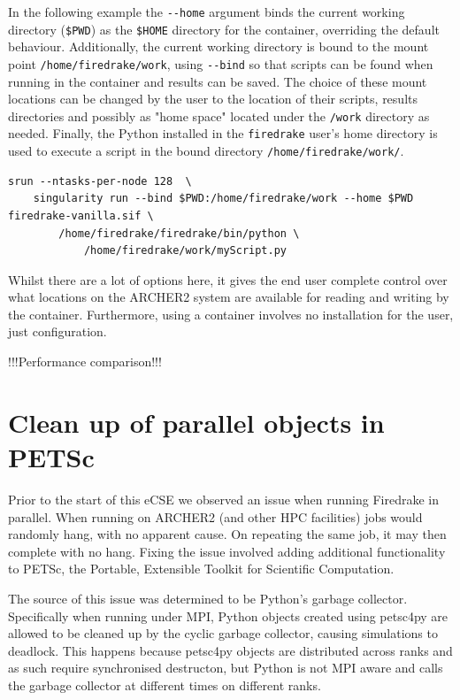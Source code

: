 \documentclass[a4paper,11pt]{article}
\begin{document}
In the following example the \verb`--home` argument binds the current working directory (\verb`$PWD`) as the \verb`$HOME` directory for the container, overriding the default behaviour.
Additionally, the current working directory is bound to the mount point \verb`/home/firedrake/work`, using \verb`--bind` so that scripts can be found when running in the container and results can be saved.
The choice of these mount locations can be changed by the user to the location of their scripts, results directories and possibly as "home space" located under the \verb`/work` directory as needed.
Finally, the Python installed in the \verb`firedrake` user's home directory is used to execute a script in the bound directory \verb`/home/firedrake/work/`.

\begin{lstlisting}
srun --ntasks-per-node 128  \
    singularity run --bind $PWD:/home/firedrake/work --home $PWD firedrake-vanilla.sif \
        /home/firedrake/firedrake/bin/python \
            /home/firedrake/work/myScript.py
\end{lstlisting}
Whilst there are a lot of options here, it gives the end user complete control over what locations on the ARCHER2 system are available for reading and writing by the container.
Furthermore, using a container involves no installation for the user, just configuration.

!!!Performance comparison!!!


\section{Clean up of parallel objects in PETSc}
\label{sec:other}
Prior to the start of this eCSE we observed an issue when running Firedrake in parallel.
When running on ARCHER2 (and other HPC facilities) jobs would randomly hang, with no apparent cause.
On repeating the same job, it may then complete with no hang.
Fixing the issue involved adding additional functionality to PETSc, the Portable, Extensible Toolkit for Scientific Computation\cite{petsc}.

The source of this issue was determined to be Python's garbage collector.
Specifically when running under MPI, Python objects created using petsc4py are allowed to be cleaned up by the cyclic garbage collector, causing simulations to deadlock.
This happens because petsc4py objects are distributed across ranks and as such require synchronised destructon, but Python is not MPI aware and calls the garbage collector at different times on different ranks.
\end{document}
